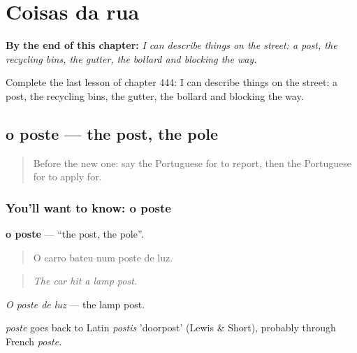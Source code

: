 
\chapter{Coisas da rua}
\label{ch:pt-coisas-da-rua}

\begin{chapteropening}
\textbf{By the end of this chapter:} \emph{I can describe things on the street: a post, the recycling bins, the gutter, the bollard and blocking the way.}

Complete the last lesson of chapter 444: I can describe things on the street: a post, the recycling bins, the gutter, the bollard and blocking the way.
\end{chapteropening}

\section[o poste]{o poste — the post, the pole}

\label{lesson:PT-C444-poste}



\begin{quote}
Before the new one: say the Portuguese for to report, then the Portuguese for to apply for.
\end{quote}

\subsection*{You'll want to know: o poste}
\textbf{o poste} — \textquotedblleft{}the post, the pole\textquotedblright{}.

\begin{quote}
O carro bateu num poste de luz.
\end{quote}

\begin{quote}
\emph{The car hit a lamp post.}
\end{quote}

\emph{O poste de luz} — the lamp post.

\begin{cousinweb}
\emph{poste} goes back to Latin \emph{postis} 'doorpost' (Lewis \& Short), probably through French \emph{poste}.
\end{cousinweb}

